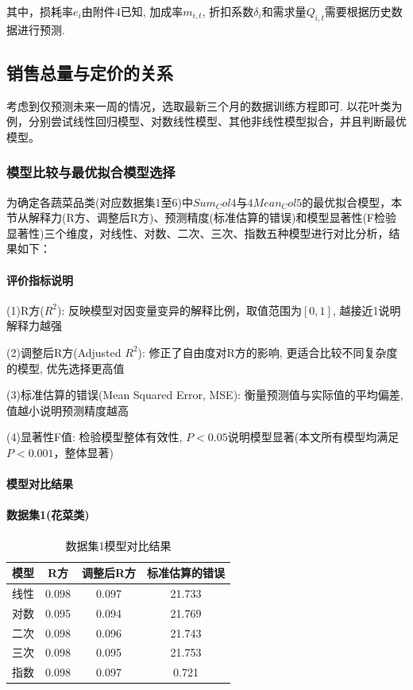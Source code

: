 \documentclass{cumcmthesis}
\begin{document}
其中，损耗率$e_i$由附件4已知, 加成率$m_{i,t}$, 
折扣系数$\delta_i$和需求量$Q_{i,t}$需要根据历史数据进行预测. 


\subsection{销售总量与定价的关系}
考虑到仅预测未来一周的情况，选取最新三个月的数据训练方程即可. 以花叶类为例，分别尝试线性回归模型、对数线性模型、其他非线性模型拟合，并且判断最优模型。

\subsubsection{模型比较与最优拟合模型选择}

为确定各蔬菜品类(对应数据集1至6)中$Sum_Col4$与$4Mean_Col5$的最优拟合模型，本节从解释力(R方、调整后R方)、预测精度(标准估算的错误)和模型显著性(F检验显著性)三个维度，对线性、对数、二次、三次、指数五种模型进行对比分析，结果如下：

\paragraph{评价指标说明}

(1)R方($R^2$): 反映模型对因变量变异的解释比例，取值范围为$[0,1]$, 越接近1说明解释力越强

(2)调整后R方(Adjusted $R^2$): 修正了自由度对R方的影响, 更适合比较不同复杂度的模型, 优先选择更高值

(3)标准估算的错误(Mean Squared Error, MSE): 衡量预测值与实际值的平均偏差, 值越小说明预测精度越高

(4)显著性F值: 检验模型整体有效性, $P<0.05$说明模型显著(本文所有模型均满足$P<0.001$，整体显著)

\paragraph{模型对比结果}

\paragraph{数据集1(花菜类)}
\begin{table}[H]
\centering
\begin{tabular}{cccc}
\hline
模型 & R方 & 调整后R方 & 标准估算的错误 \\
\hline
线性 & 0.098 & 0.097 & 21.733 \\
对数 & 0.095 & 0.094 & 21.769 \\
二次 & 0.098 & 0.096 & 21.743 \\
三次 & 0.098 & 0.095 & 21.753 \\
指数 & 0.098 & 0.097 & 0.721 \\
\hline
\end{tabular}
\caption{数据集1模型对比结果}
\label{tab:dataset1}
\end{table}
\end{document}
